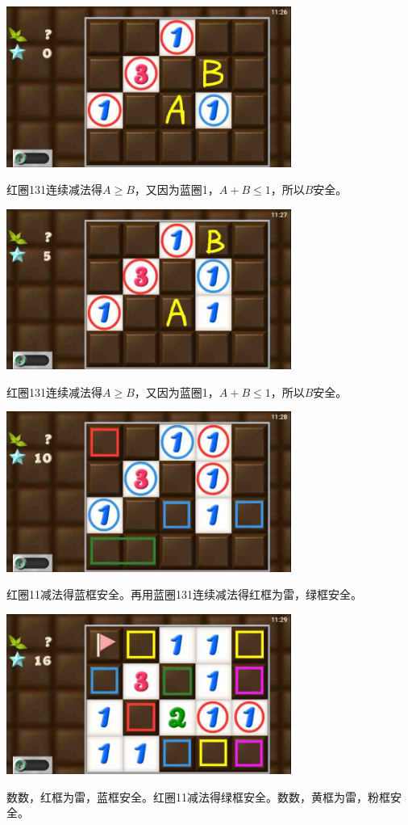 \subsection{} %
\begin{center}
    \includegraphics[width=0.7\textwidth]{puzzlelow/165-1.jpg}
\end{center}
红圈131连续减法得$A\ge B$，又因为蓝圈1，$A+B\le 1$，所以$B$安全。
\begin{center}
    \includegraphics[width=0.7\textwidth]{puzzlelow/165-2.jpg}
\end{center}
红圈131连续减法得$A\ge B$，又因为蓝圈1，$A+B\le 1$，所以$B$安全。
\begin{center}
    \includegraphics[width=0.7\textwidth]{puzzlelow/165-3.jpg}
\end{center}
红圈11减法得蓝框安全。再用蓝圈131连续减法得红框为雷，绿框安全。
\begin{center}
    \includegraphics[width=0.7\textwidth]{puzzlelow/165-4.jpg}
\end{center}
数数，红框为雷，蓝框安全。红圈11减法得绿框安全。数数，黄框为雷，粉框安全。

